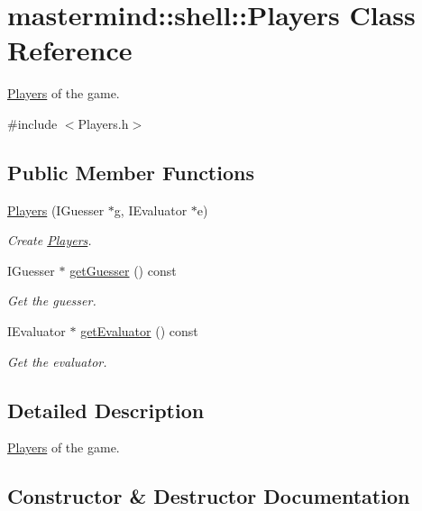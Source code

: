 \hypertarget{classmastermind_1_1shell_1_1_players}{}\section{mastermind\+:\+:shell\+:\+:Players Class Reference}
\label{classmastermind_1_1shell_1_1_players}


\hyperlink{classmastermind_1_1shell_1_1_players}{Players} of the game.  




{\ttfamily \#include $<$Players.\+h$>$}

\subsection*{Public Member Functions}
\begin{DoxyCompactItemize}
\item 
\hyperlink{classmastermind_1_1shell_1_1_players_a0789193995383df718119738773a4d45}{Players} (I\+Guesser $\ast$g, I\+Evaluator $\ast$e)
\begin{DoxyCompactList}\small\item\em Create \hyperlink{classmastermind_1_1shell_1_1_players}{Players}. \end{DoxyCompactList}\item 
I\+Guesser $\ast$ \hyperlink{classmastermind_1_1shell_1_1_players_a66aa10a32b7469eea4f8668ac995cf73}{get\+Guesser} () const
\begin{DoxyCompactList}\small\item\em Get the guesser. \end{DoxyCompactList}\item 
I\+Evaluator $\ast$ \hyperlink{classmastermind_1_1shell_1_1_players_ad79169b7a2096cac0b161d6ed015023f}{get\+Evaluator} () const
\begin{DoxyCompactList}\small\item\em Get the evaluator. \end{DoxyCompactList}\end{DoxyCompactItemize}


\subsection{Detailed Description}
\hyperlink{classmastermind_1_1shell_1_1_players}{Players} of the game. 

\subsection{Constructor \& Destructor Documentation}
\hypertarget{classmastermind_1_1shell_1_1_players_a0789193995383df718119738773a4d45}{}\label{classmastermind_1_1shell_1_1_players_a0789193995383df718119738773a4d45} 
